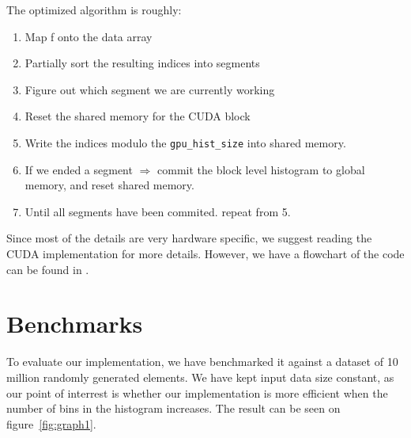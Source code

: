 \documentclass[12pt, a4paper, hidelinks]{article}
\renewcommand{\tt}[1]{\texttt{#1}}
\begin{document}
The optimized algorithm is roughly:


\begin{enumerate}
\item Map f onto the data array
\item Partially sort the resulting indices into segments
\item Figure out which segment we are currently working
\item Reset the shared memory for the CUDA block
\item Write the indices modulo the \tt{gpu\_hist\_size} into shared memory.
\item If we ended a segment $\Rightarrow$ commit the block level histogram to global memory,
      and reset shared memory.
\item Until all segments have been commited. repeat from 5.
\end{enumerate}

Since most of the details are very hardware specific,
we suggest reading the CUDA implementation for more details.
However, we have a flowchart of the code can be found in .

\section{Benchmarks}
To evaluate our implementation, we have benchmarked it against
a dataset of 10 million randomly generated elements.
We have kept input data size constant,
as our point of interrest is whether our implementation is more
efficient when the number of bins in the histogram increases.
The result can be seen on figure~\ref{fig:graph1}.
\end{document}
